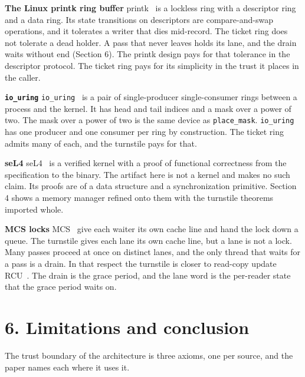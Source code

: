 \textbf{The Linux printk ring buffer} printk~\cite{src:printk} is a lockless ring with a descriptor ring and a data ring. Its state transitions on descriptors are compare-and-swap operations, and it tolerates a writer that dies mid-record. The ticket ring does not tolerate a dead holder. A pass that never leaves holds its lane, and the drain waits without end (Section 6). The printk design pays for that tolerance in the descriptor protocol. The ticket ring pays for its simplicity in the trust it places in the caller.

\textbf{\texttt{io\_\allowbreak{}uring}} \texttt{io\_\allowbreak{}uring}~\cite{src:io-uring} is a pair of single-producer single-consumer rings between a process and the kernel. It has head and tail indices and a mask over a power of two. The mask over a power of two is the same device as \texttt{place\_\allowbreak{}mask}. \texttt{io\_\allowbreak{}uring} has one producer and one consumer per ring by construction. The ticket ring admits many of each, and the turnstile pays for that.

\textbf{seL4} seL4~\cite{src:seL4} is a verified kernel with a proof of functional correctness from the specification to the binary. The artifact here is not a kernel and makes no such claim. Its proofs are of a data structure and a synchronization primitive. Section 4 shows a memory manager refined onto them with the turnstile theorems imported whole.

\textbf{MCS locks} MCS~\cite{src:MCS} give each waiter its own cache line and hand the lock down a queue. The turnstile gives each lane its own cache line, but a lane is not a lock. Many passes proceed at once on distinct lanes, and the only thread that waits for a pass is a drain. In that respect the turnstile is closer to read-copy update RCU~\cite{src:RCU}. The drain is the grace period, and the lane word is the per-reader state that the grace period waits on.

\section{\texorpdfstring{6. Limitations and conclusion}{6. Limitations and conclusion}}

The trust boundary of the architecture is three axioms, one per source, and the paper names each where it uses it.

